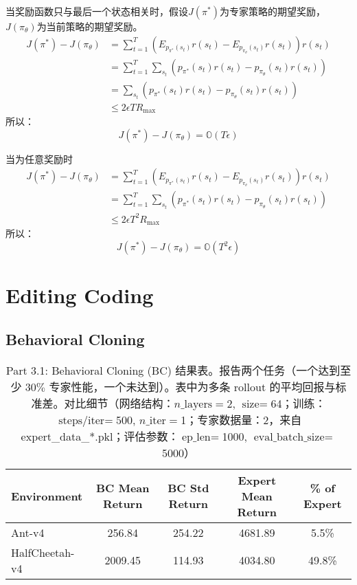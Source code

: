 \documentclass[12pt,oneside]{book}
\begin{document}
当奖励函数只与最后一个状态相关时，假设$J(\pi^*)$为专家策略的期望奖励，$J(\pi_{\theta})$为当前策略的期望奖励。
\begin{align}
    {J}(\pi^*) - {J}(\pi_{\theta}) 
    &= \sum_{t=1}^{T} (E_{p_{\pi^*}(s_t)}r(s_t) - E_{p_{\pi_{\theta}}(s_t)}r(s_t)) r(s_t)\nonumber \\
    &= \sum_{t=1}^{T} \sum_{s_t} (p_{\pi^*}(s_t)r(s_t) - p_{\pi_{\theta}}(s_t)r(s_t)) \nonumber \\
    &= \sum_{s_t} (p_{\pi^*}(s_t)r(s_t) - p_{\pi_{\theta}}(s_t)r(s_t)) \nonumber \\
    &\leq 2\epsilon T R_{\max}
\end{align}
所以：
\begin{equation}
    {J}(\pi^*) - {J}(\pi_{\theta}) = \mathbb{O}(T \epsilon)
\end{equation}

当为任意奖励时
\begin{align}
    {J}(\pi^*) - {J}(\pi_{\theta}) 
    &= \sum_{t=1}^{T} (E_{p_{\pi^*}(s_t)}r(s_t) - E_{p_{\pi_{\theta}}(s_t)}r(s_t)) r(s_t)\nonumber \\
    &= \sum_{t=1}^{T} \sum_{s_t} (p_{\pi^*}(s_t)r(s_t) - p_{\pi_{\theta}}(s_t)r(s_t)) \nonumber \\
    &\leq 2\epsilon T^2 R_{\max}
\end{align}
所以：
\begin{equation}
    {J}(\pi^*) - {J}(\pi_{\theta}) = \mathbb{O}(T^2 \epsilon)
\end{equation}

\section{Editing Coding}

\subsection{Behavioral Cloning}
\begin{table}[h!]
    \centering
    \caption{Part 3.1: Behavioral Cloning (BC) 结果表。报告两个任务（一个达到至少 \(30\%\) 专家性能，一个未达到）。表中为多条 rollout 的平均回报与标准差。对比细节（网络结构：\(n\_\text{layers}=\)2, \(\text{size}=\)64；训练：\(\text{steps/iter}=\)500, \(n\_\text{iter}=\)1；专家数据量：2，来自expert\_data\_*.pkl；评估参数：\(\text{ep\_len}=\)1000, \(\text{eval\_batch\_size}=\)5000）}
    \label{tab:bc_part3_1}
    \vspace{0.5em}
    \begin{tabular}{lcccc}
    \hline
    Environment & BC Mean Return & BC Std Return & Expert Mean Return & \% of Expert \\
    \hline
    Ant-v4 & 256.84 & 254.22 & 4681.89 & 5.5\% \\
    HalfCheetah-v4 & 2009.45 & 114.93 & 4034.80 & 49.8\% \\
    \hline
    \end{tabular}
\end{table}
\end{document}
